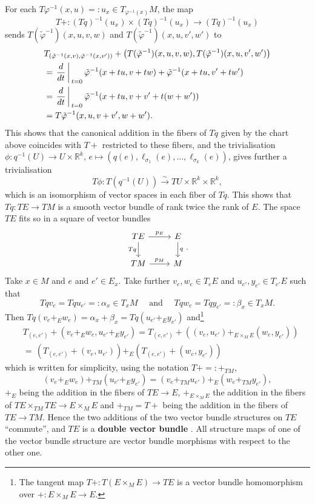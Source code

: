 \documentclass{amsart}
\theoremstyle{plain}
\newcommand{\R}{\mathbb{R}}
\newcommand{\inv}{^{-1}}
\newcommand{\an}[1]{\arrowvert_{#1}}
\begin{document}
For each $T\varphi\inv(x,u)=:u_x\in T_{\varphi\inv(x)}M$, the map
\[ T+\colon (Tq)\inv(u_x)\times (Tq)\inv(u_x)\to (Tq)\inv(u_x)
\]
sends $T(\tilde\varphi\inv)(x,u,v,w)$ and $T(\tilde\varphi\inv)(x,u,v',w')$ to
\begin{equation*}
\begin{split}
& T_{(\tilde\varphi\inv(x,v), \tilde\varphi\inv(x,v'))}+\left(T(\tilde\varphi\inv)(x,u,v,w), T(\tilde\varphi\inv)(x,u,v',w')\right)\\
&=\left.\frac{d}{dt}\right\an{t=0}\tilde\varphi\inv(x+tu, v+tw)+\tilde\varphi\inv(x+tu, v'+tw')\\
&=\left.\frac{d}{dt}\right\an{t=0}\tilde\varphi\inv(x+tu,  v+v'+t(w+w'))\\
&=T\tilde\varphi\inv(x,u,v+v',w+w').
\end{split}
\end{equation*}
This shows that the canonical addition in the fibers of $Tq$ given by the chart above coincides with $T\!+$ restricted to these fibers, and the trivialisation $\phi\colon q\inv(U)\to U\times \R^k$, $e\mapsto (q(e), \ell_{\sigma_1}(e), \ldots, \ell_{\sigma_k}(e))$, gives further a trivialisation
\[ T\phi\colon T(q\inv(U))\overset{\sim}{\longrightarrow} TU\times \R^k\times \R^k,
\]
which is an isomorphism of vector spaces in each fiber of $Tq$.
This shows that $Tq\colon TE\to TM$ is a smooth vector bundle of rank twice the rank of $E$. The space $TE$ fits so in  a square of vector bundles 
\[\begin{tikzcd}
	{TE} & {E} \\
	{TM} & {M}
	\arrow["{Tq}"', from=1-1, to=2-1]
	\arrow["p_E", from=1-1, to=1-2]
	\arrow["{q}", from=1-2, to=2-2]
	\arrow["{p_M}", from=2-1, to=2-2]
\end{tikzcd}.\]
Take $x\in M$ and $e$ and $e'\in E_x$. Take further $v_e, w_e\in T_eE$ and $u_{e'}, y_{e'}\in T_{e'}E$ such that 
\[ Tqv_e=Tqu_{e'}=:\alpha_x\in T_xM \quad \text{ and } \quad Tqw_e=Tqy_{e'}=:\beta_x\in T_xM.
\]
Then 
$Tq(v_e+_Ew_e)=\alpha_x+\beta_x=Tq(u_{e'}+_Ey_{e'})$
and\footnote{The tangent map $T+\colon T(E\times_M E)\to TE$ is a vector bundle homomorphism over $+\colon E\times_ME\to E$.}
\begin{equation*}
\begin{split}
&T_{(e,e')}+(v_{e}+_Ew_{e}, u_{e'}+_Ey_{e'})=T_{(e,e')}+\left((v_e, u_{e'})+_{E\times_M E}(w_e,y_{e'})\right)\\
&=\,\left(T_{(e,e')}+(v_e,u_{e'})\right)+_E\left(T_{(e,e')}+(w_e,y_{e'})\right)
\end{split}
\end{equation*}
which is written for simplicity, using the notation $T+=:+_{TM}$, 
\[(v_{e}+_Ew_{e})+_{TM}(u_{e'}+_Ey_{e'})=(v_e+_{TM}u_{e'})+_E(w_e+_{TM}y_{e'}),
\]
$+_E$ being the addition in the fibers of $TE\to E$, $+_{E\times_ME}$ the addition in the fibers of $TE\times_{TM}TE\to E\times_ME$ and $+_{TM}=T+$ being the addition in the fibers of $TE\to TM$.
Hence the two additions of the two vector bundle structures on $TE$ ``commute'', and $TE$ is a \textbf{double vector bundle} \cite{Pradines77,Mackenzie05}. All structure maps of one of the vector bundle structure are vector bundle morphisms with respect to the other one.
\end{document}
